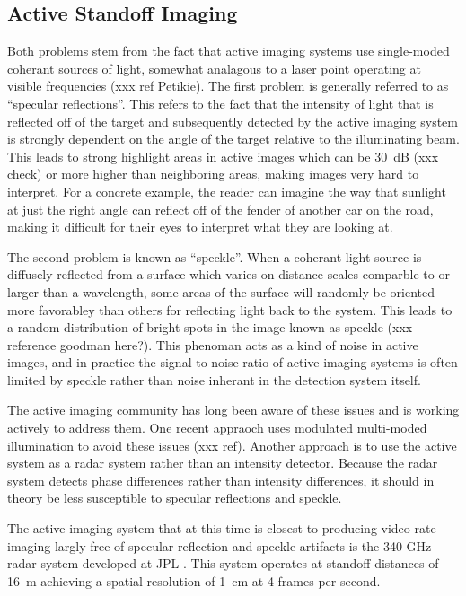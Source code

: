 \subsection{Active Standoff Imaging}

Both problems stem from the fact that active imaging systems use single-moded coherant sources of light, somewhat analagous to a laser point operating at visible frequencies (xxx ref Petikie).
The first problem is generally referred to as ``specular reflections''.
This refers to the fact that the intensity of light that is reflected off of the target and subsequently detected by the active imaging system is strongly dependent on the angle of the target relative to the illuminating beam.
This leads to strong highlight areas in active images which can be \SI{30}{\dB} (xxx check) or more higher than neighboring areas, making images very hard to interpret.
For a concrete example, the reader can imagine the way that sunlight at just the right angle can reflect off of the fender of another car on the road, making it difficult for their eyes to interpret what they are looking at.

The second problem is known as ``speckle''.
When a coherant light source is diffusely reflected from a surface which varies on distance scales comparble to or larger than a wavelength, some areas of the surface will randomly be oriented more favorabley than others for reflecting light back to the system.
This leads to a random distribution of bright spots in the image known as speckle (xxx reference goodman here?).
This phenoman acts as a kind of noise in active images, and in practice the signal-to-noise ratio of active imaging systems is often limited by speckle rather than noise inherant in the detection system itself.

The active imaging community has long been aware of these issues and is working actively to address them.
One recent appraoch uses modulated multi-moded illumination to avoid these issues (xxx ref).
Another approach is to use the active system as a radar system rather than an intensity detector.
Because the radar system detects phase differences rather than intensity differences, it should in theory be less susceptible to specular reflections and speckle.

The active imaging system that at this time is closest to producing video-rate imaging largly free of specular-reflection and speckle artifacts is the 340 GHz radar system developed at JPL \cite{xxx}.
This system operates at standoff distances of \SI{16}{\m} achieving a spatial resolution of \SI{1}{\cm} at 4 frames per second.

